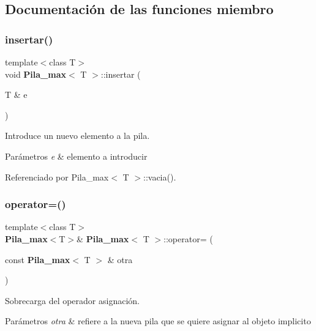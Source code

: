 \subsection{Documentación de las funciones miembro}
\label{classPila__max_aaf2403b8383f4b7d9c060c676e59bd95} 
\subsubsection{insertar()}
{\footnotesize\ttfamily template$<$class T$>$ \\
void {\bf Pila\+\_\+max}$<$ T $>$\+::insertar (\begin{DoxyParamCaption}\item[{T \&}]{e }\end{DoxyParamCaption})}



Introduce un nuevo elemento a la pila. 


\begin{DoxyParams}{Parámetros}
{\em e} & elemento a introducir \\
\hline
\end{DoxyParams}


Referenciado por Pila\+\_\+max$<$ T $>$\+::vacia().

\label{classPila__max_a077cce5bded391524aebd8c468166e5c} 
\subsubsection{operator=()}
{\footnotesize\ttfamily template$<$class T$>$ \\
{\bf Pila\+\_\+max}$<$T$>$\& {\bf Pila\+\_\+max}$<$ T $>$\+::operator= (\begin{DoxyParamCaption}\item[{const {\bf Pila\+\_\+max}$<$ T $>$ \&}]{otra }\end{DoxyParamCaption})}



Sobrecarga del operador asignación. 


\begin{DoxyParams}{Parámetros}
{\em otra} & refiere a la nueva pila que se quiere asignar al objeto implicito \\
\hline
\end{DoxyParams}


